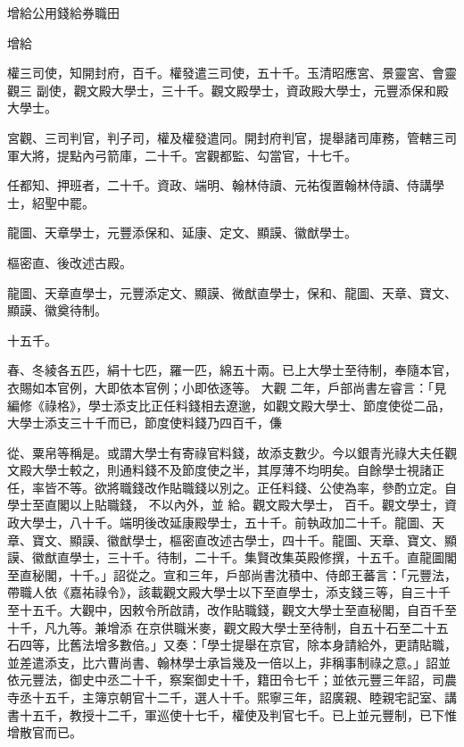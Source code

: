 
\begin{pinyinscope}

 增給公用錢給券職田



 增給



 權三司使，知開封府，百千。權發遣三司使，五十千。玉清昭應宮、景靈宮、會靈觀三
 副使，觀文殿大學士，三十千。觀文殿學士，資政殿大學士，元豐添保和殿大學士。



 宮觀、三司判官，判子司，權及權發遣同。開封府判官，提舉諸司庫務，管轄三司軍大將，提點內弓箭庫，二十千。宮觀都監、勾當官，十七千。



 任都知、押班者，二十千。資政、端明、翰林侍讀、元祐復置翰林侍讀、侍講學士，紹聖中罷。



 龍圖、天章學士，元豐添保和、延康、定文、顯謨、徽猷學士。



 樞密直、後改述古殿。



 龍圖、天章直學士，元豐添定文、顯謨、微猷直學士，保和、龍圖、天章、寶文、顯謨、徽奠待制。



 十五千。



 春、冬綾各五匹，絹十七匹，羅一匹，綿五十兩。已上大學士至待制，奉隨本官，衣賜如本官例，大即依本官例；小即依逐等。
 大觀
 二年，戶部尚書左睿言：「見編修《祿格》，學士添支比正任料錢相去遼邈，如觀文殿大學士、節度使從二品，大學士添支三十千而已，節度使料錢乃四百千，傔



 從、粟帛等稱是。或謂大學士有寄祿官料錢，故添支數少。今以銀青光祿大夫任觀文殿大學士較之，則通料錢不及節度使之半，其厚薄不均明矣。自餘學士視諸正任，率皆不等。欲將職錢改作貼職錢以別之。正任料錢、公使為率，參酌立定。自學士至直閣以上貼職錢，
 不以內外，並
 給。觀文殿大學士，
 百千。觀文學士，資政大學士，八十千。端明後改延康殿學士，五十千。前執政加二十千。龍圖、天章、寶文、顯謨、徽猷學士，樞密直改述古學士，四十千。龍圖、天章、寶文、顯謨、徽猷直學士，三十千。待制，二十千。集賢改集英殿修撰，十五千。直龍圖閣至直秘閣，十千。」詔從之。宣和三年，戶部尚書沈積中、侍郎王蕃言：「元豐法，帶職人依《嘉祐祿令》，該載觀文殿大學士以下至直學士，添支錢三等，自三十千至十五千。大觀中，因敕令所啟請，改作貼職錢，觀文大學士至直秘閣，自百千至十千，凡九等。兼增添
 在京供職米麥，觀文殿大學士至待制，自五十石至二十五石四等，比舊法增多數倍。」又奏：「學士提舉在京官，除本身請給外，更請貼職，並差遣添支，比六曹尚書、翰林學士承旨幾及一倍以上，非稱事制祿之意。」詔並依元豐法，御史中丞二十千，察案御史十千，籍田令七千；並依元豐三年詔，司農寺丞十五千，主簿京朝官十二千，選人十千。熙寧三年，詔廣親、睦親宅記室、講書十五千，教授十二千，軍巡使十七千，權使及判官七千。已上並元豐制，已下惟增散官而已。




\end{pinyinscope}
